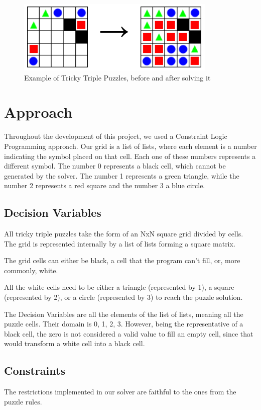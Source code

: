 \documentclass[runningheads]{llncs}
\begin{document}
\begin{figure} [h]
    \centering
    \includegraphics[scale=0.7]{img/tricky-triple.png}
    \caption{Example of Tricky Triple Puzzles, before and after solving it} \label{fig1}
\end{figure}

\section{Approach}
Throughout the development of this project, we used a Constraint Logic Programming approach.
Our grid is a list of lists, where each element is a number indicating the symbol placed on that cell.
Each one of these numbers represents a different symbol.
The number 0 represents a black cell, which cannot be generated by the solver.
The number 1 represents a green triangle,
    while the number 2 represents a red square and the number 3 a blue circle.

\subsection{Decision Variables}
All tricky triple puzzles take the form of an NxN square grid divided by cells.
The grid is represented internally by a list of lists forming a square matrix.

The grid cells can either be black, a cell that the program can't fill, or, more commonly, white.

All the white cells need to be either a triangle (represented by 1), a square (represented by 2),
    or a circle (represented by 3) to reach the puzzle solution.

The Decision Variables are all the elements of the list of lists, meaning all the puzzle cells.
Their domain is {0, 1, 2, 3}. However, being the representative of a black cell,
    the zero is not considered a valid value to fill an empty cell,
    since that would transform a white cell into a black cell.

\subsection{Constraints}
The restrictions implemented in our solver are faithful to the ones from the puzzle rules.
\end{document}
